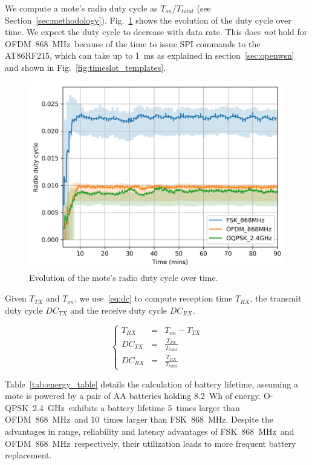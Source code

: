 \documentclass[sensors,article,submit,moreauthors,pdftex]{Definitions/mdpi}
\newcommand{\fsk}           {FSK~868~MHz}
\newcommand{\oqpsk}         {O-QPSK~2.4~GHz}
\newcommand{\ofdm}          {OFDM~868~MHz}
\newcommand{\figwidth}      {0.80}
\begin{document}

We compute a mote's radio duty cycle as $T_{on}/T_{total}$ (see Section~\ref{sec:methodology}).
Fig.~\ref{fig:dutyCycle_time} shows the evolution of the duty cycle over time.
We expect the duty cycle to decrease with data rate.
This does \textit{not} hold for \ofdm\ because of the time to issue SPI commands to the AT86RF215, which can take up to 1~ms as explained in section~\ref{sec:openwsn} and shown in Fig.~\ref{fig:timeslot_templates}.

\begin{figure}
	\centering
	\includegraphics[width=\figwidth\columnwidth]{dutyCycle_time}
	\caption{
	    Evolution of the mote's radio duty cycle over time.
	}
    \label{fig:dutyCycle_time}
\end{figure}

Given $T_{TX}$ and $T_{on}$, we use~\eqref{eq:dc} to compute reception time $T_{RX}$, the transmit duty cycle $DC_{TX}$ and the receive duty cycle $DC_{RX}$.

\begin{equation}
    \left\{
        \begin{array}{lcl}
            T_{RX}  & = & T_{on}-T_{TX}            \\
            DC_{TX} & = & \frac{T_{TX}}{T_{total}} \\
            DC_{RX} & = & \frac{T_{RX}}{T_{total}}
        \end{array}
    \right.
    \label{eq:dc}
\end{equation}

Table~\ref{tab:energy_table} details the calculation of battery lifetime, assuming a mote is powered by a pair of AA batteries holding 8.2~Wh of energy.
\oqpsk\ exhibits a battery lifetime
      5~times larger than \ofdm\ and
     10~times larger than \fsk.
Despite the advantages in range, reliability and latency advantages of \fsk\ and \ofdm\ respectively, their utilization leads to more frequent battery replacement.
\end{document}
